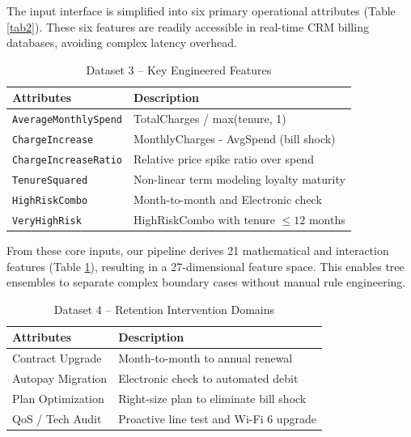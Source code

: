 \documentclass[conference]{IEEEtran}
\begin{document}
The input interface is simplified into six primary operational attributes (Table \ref{tab2}). These six features are readily accessible in real-time CRM billing databases, avoiding complex latency overhead.

\begin{table}[htbp]
\caption{Dataset 3 -- Key Engineered Features}
\begin{center}
\begin{tabular}{ll}
\toprule
\textbf{Attributes} & \textbf{Description} \\
\midrule
\texttt{AverageMonthlySpend} & TotalCharges / max(tenure, 1) \\
\texttt{ChargeIncrease} & MonthlyCharges - AvgSpend (bill shock) \\
\texttt{ChargeIncreaseRatio} & Relative price spike ratio over spend \\
\texttt{TenureSquared} & Non-linear term modeling loyalty maturity \\
\texttt{HighRiskCombo} & Month-to-month and Electronic check \\
\texttt{VeryHighRisk} & HighRiskCombo with tenure $\le 12$ months \\
\bottomrule
\end{tabular}
\label{tab3}
\end{center}
\end{table}

From these core inputs, our pipeline derives 21 mathematical and interaction features (Table \ref{tab3}), resulting in a 27-dimensional feature space. This enables tree ensembles to separate complex boundary cases without manual rule engineering.

\begin{table}[htbp]
\caption{Dataset 4 -- Retention Intervention Domains}
\begin{center}
\begin{tabular}{ll}
\toprule
\textbf{Attributes} & \textbf{Description} \\
\midrule
Contract Upgrade & Month-to-month to annual renewal \\
Autopay Migration & Electronic check to automated debit \\
Plan Optimization & Right-size plan to eliminate bill shock \\
QoS / Tech Audit & Proactive line test and Wi-Fi 6 upgrade \\
\bottomrule
\end{tabular}
\label{tab4}
\end{center}
\end{table}
\end{document}
